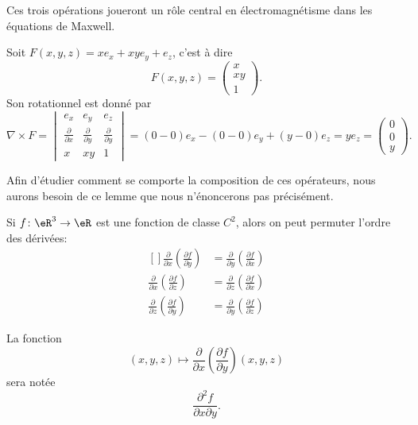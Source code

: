 Ces trois opérations joueront un rôle central en électromagnétisme dans les équations de Maxwell.

\begin{example}
    Soit $F(x,y,z)=x e_x+xy e_y+e_z$, c'est à dire
    \begin{equation}
        F(x,y,z)=\begin{pmatrix}
            x    \\ 
            xy    \\ 
            1    
        \end{pmatrix}.
    \end{equation}
    Son rotationnel est donné par
    \begin{equation}
        \nabla\times F=\begin{vmatrix}
            e_x    &   e_y    &   e_z    \\
            \frac{ \partial  }{ \partial x }    &   \frac{ \partial  }{ \partial y }    &   \frac{ \partial  }{ \partial y }    \\
            x    &   xy    &   1
        \end{vmatrix}=
        (0-0)e_x-(0-0)e_y+(y-0)e_z=ye_z=\begin{pmatrix}
            0    \\ 
            0    \\ 
            y    
        \end{pmatrix}.
    \end{equation}
\end{example}

Afin d'étudier comment se comporte la composition de ces opérateurs, nous aurons besoin de ce lemme que nous n'énoncerons pas précisément.
\begin{lemma}       \label{LemPermDerrxyzOM}
    Si $f\colon \eR^3\to \eR$ est une fonction de classe $C^2$, alors on peut permuter l'ordre des dérivées:
    \begin{equation}
        \begin{aligned}[]
            \frac{ \partial  }{ \partial x }\left( \frac{ \partial f }{ \partial y } \right)&=\frac{ \partial  }{ \partial y }\left( \frac{ \partial f }{ \partial x } \right)\\
            \frac{ \partial  }{ \partial x }\left( \frac{ \partial f }{ \partial z } \right)&=\frac{ \partial  }{ \partial z }\left( \frac{ \partial f }{ \partial x } \right)\\
            \frac{ \partial  }{ \partial z }\left( \frac{ \partial f }{ \partial y } \right)&=\frac{ \partial  }{ \partial y }\left( \frac{ \partial f }{ \partial z } \right)
        \end{aligned}
    \end{equation}
\end{lemma}
La fonction
\begin{equation}
    (x,y,z)\mapsto\frac{ \partial  }{ \partial x }\left( \frac{ \partial f }{ \partial y } \right)(x,y,z)
\end{equation}
sera notée
\begin{equation}
    \frac{ \partial^2f }{ \partial x\partial y }.
\end{equation}

